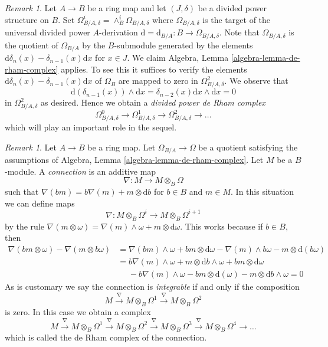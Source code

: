 \documentclass{stacks-project}
\theoremstyle{plain}
\theoremstyle{definition}
\theoremstyle{remark}
\newtheorem{remark}[subsection]{Remark}
\numberwithin{equation}{subsection}
\begin{document}
\begin{remark}
\label{remark-divided-powers-de-rham-complex}
Let $A \to B$ be a ring map and let $(J, \delta)$ be a divided power
structure on $B$. Set
$\Omega_{B/A, \delta}^i = \wedge^i_B \Omega_{B/A, \delta}$
where $\Omega_{B/A, \delta}$ is the target of the universal divided power
$A$-derivation $\text{d} = \text{d}_{B/A} : B \to \Omega_{B/A, \delta}$.
Note that $\Omega_{B/A, \delta}$ is the quotient of $\Omega_{B/A}$ by the
$B$-submodule generated by the elements
$\text{d}\delta_n(x) - \delta_{n - 1}(x)\text{d}x$ for $x \in J$.
We claim Algebra, Lemma \ref{algebra-lemma-de-rham-complex} applies.
To see this it suffices to verify the elements
$\text{d}\delta_n(x) - \delta_{n - 1}(x)\text{d}x$
of $\Omega_B$ are mapped to zero in $\Omega^2_{B/A, \delta}$.
We observe that
$$
\text{d}(\delta_{n - 1}(x)) \wedge \text{d}x
= \delta_{n - 2}(x) \text{d}x \wedge \text{d}x = 0
$$
in $\Omega^2_{B/A, \delta}$ as desired. Hence we obtain a
{\it divided power de Rham complex}
$$
\Omega^0_{B/A, \delta} \to \Omega^1_{B/A, \delta} \to
\Omega^2_{B/A, \delta} \to \ldots
$$
which will play an important role in the sequel.
\end{remark}

\begin{remark}
\label{remark-connection}
Let $A \to B$ be a ring map. Let $\Omega_{B/A} \to \Omega$
be a quotient satisfying the assumptions of
Algebra, Lemma \ref{algebra-lemma-de-rham-complex}.
Let $M$ be a $B$-module. A {\it connection} is an additive map
$$
\nabla : M \longrightarrow M \otimes_B \Omega
$$
such that $\nabla(bm) = b \nabla(m) + m \otimes \text{d}b$
for $b \in B$ and $m \in M$. In this situation we can define maps
$$
\nabla : M \otimes_B \Omega^i \longrightarrow M \otimes_B \Omega^{i + 1}
$$
by the rule $\nabla(m \otimes \omega) = \nabla(m) \wedge \omega +
m \otimes \text{d}\omega$. This works because if $b \in B$, then
\begin{align*}
\nabla(bm \otimes \omega) - \nabla(m \otimes b\omega)
& =
\nabla(bm) \wedge \omega + bm \otimes \text{d}\omega
- \nabla(m) \wedge b\omega - m \otimes \text{d}(b\omega) \\
& =
b\nabla(m) \wedge \omega + m \otimes \text{d}b \wedge \omega
+ bm \otimes \text{d}\omega \\
& \ \ \ \ \ \ - b\nabla(m) \wedge \omega - bm \otimes \text{d}(\omega)
- m \otimes \text{d}b \wedge \omega = 0
\end{align*}
As is customary we say the connection is {\it integrable} if and
only if the composition
$$
M \xrightarrow{\nabla} M \otimes_B \Omega^1
\xrightarrow{\nabla} M \otimes_B \Omega^2
$$
is zero. In this case we obtain a complex
$$
M \xrightarrow{\nabla} M \otimes_B \Omega^1
\xrightarrow{\nabla} M \otimes_B \Omega^2
\xrightarrow{\nabla} M \otimes_B \Omega^3
\xrightarrow{\nabla} M \otimes_B \Omega^4 \to \ldots
$$
which is called the de Rham complex of the connection.
\end{remark}
\end{document}
